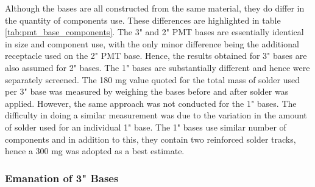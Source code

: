 Although the bases are all constructed from the same material, they do differ in the quantity of components use. These differences are highlighted in table \ref{tab:pmt_base_components}. The 3" and 2" PMT bases are essentially identical in size and component use, with the only minor difference being the additional receptacle used on the 2" PMT base. Hence, the results obtained for 3" bases are also assumed for 2" bases. The 1" bases are substantially different and hence were separately screened. The 180 mg value quoted for the total mass of solder used per 3" base was measured by weighing the bases before and after solder was applied. However, the same approach was not conducted for the 1" bases. The difficulty in doing a similar measurement was due to the variation in the amount of solder used for an individual 1" base. The 1" bases use similar number of components and in addition to this, they contain two reinforced solder tracks, hence a 300 mg was adopted as a best estimate. 


\subsubsection{Emanation of 3" Bases}

